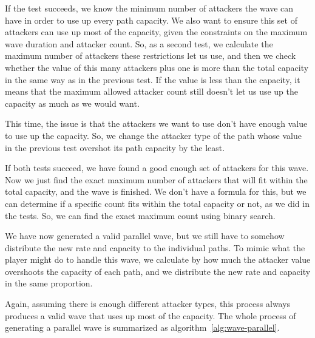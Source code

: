 If the test succeeds, we know the minimum number of attackers the wave can have in order to use up every path capacity.
We also want to ensure this set of attackers can use up most of the capacity, given the constraints on the maximum wave duration and attacker count.
So, as a second test, we calculate the maximum number of attackers these restrictions let us use, and then we check whether the value of this many attackers plus one is more than the total capacity in the same way as in the previous test.
If the value is less than the capacity, it means that the maximum allowed attacker count still doesn't let us use up the capacity as much as we would want.

This time, the issue is that the attackers we want to use don't have enough value to use up the capacity.
So, we change the attacker type of the path whose value in the previous test overshot its path capacity by the least.

If both tests succeed, we have found a good enough set of attackers for this wave.
Now we just find the exact maximum number of attackers that will fit within the total capacity, and the wave is finished.
We don't have a formula for this, but we can determine if a specific count fits within the total capacity or not, as we did in the tests.
So, we can find the exact maximum count using binary search.

We have now generated a valid parallel wave, but we still have to somehow distribute the new rate and capacity to the individual paths.
To mimic what the player might do to handle this wave, we calculate by how much the attacker value overshoots the capacity of each path, and we distribute the new rate and capacity in the same proportion.

Again, assuming there is enough different attacker types, this process always produces a valid wave that uses up most of the capacity.
The whole process of generating a parallel wave is summarized as algorithm~\ref{alg:wave-parallel}.


